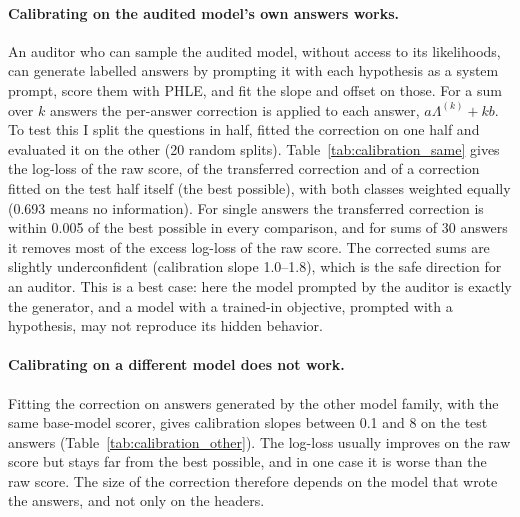 \documentclass{article}
\newcommand{\phle}{PHLE\xspace}
\begin{document}
\paragraph{Calibrating on the audited model's own answers works.}
An auditor who can sample the audited model, without access to its likelihoods, can generate labelled answers by prompting it with each hypothesis as a system prompt, score them with \phle, and fit the slope and offset on those.
For a sum over $k$ answers the per-answer correction is applied to each answer, $a\Lambda^{(k)} + kb$.
To test this I split the questions in half, fitted the correction on one half and evaluated it on the other (20 random splits).
Table~\ref{tab:calibration_same} gives the log-loss of the raw score, of the transferred correction and of a correction fitted on the test half itself (the best possible), with both classes weighted equally (0.693 means no information).
For single answers the transferred correction is within 0.005 of the best possible in every comparison, and for sums of 30 answers it removes most of the excess log-loss of the raw score.
The corrected sums are slightly underconfident (calibration slope 1.0--1.8), which is the safe direction for an auditor.
This is a best case: here the model prompted by the auditor is exactly the generator, and a model with a trained-in objective, prompted with a hypothesis, may not reproduce its hidden behavior.

\begin{table}[h]
  \centering
  \caption{Calibration fitted on the audited model's own answers to half of the questions and applied to the other half (Olmo base \phle; mean over 20 splits). Balanced log-loss in nats of the raw score, the transferred correction, and a correction fitted on the test half; and the calibration slope of the transferred correction for $k=30$.}
  \label{tab:calibration_same}
  
\end{table}

\paragraph{Calibrating on a different model does not work.}
Fitting the correction on answers generated by the other model family, with the same base-model scorer, gives calibration slopes between 0.1 and 8 on the test answers (Table~\ref{tab:calibration_other}).
The log-loss usually improves on the raw score but stays far from the best possible, and in one case it is worse than the raw score.
The size of the correction therefore depends on the model that wrote the answers, and not only on the headers.
\end{document}
